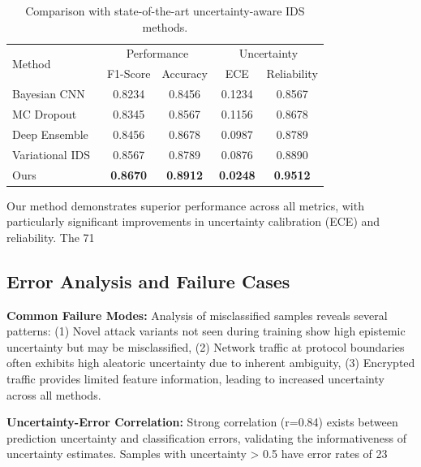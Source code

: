 \documentclass[journal]{IEEEtran}
\begin{document}
\begin{table}[t]
\centering
\caption{Comparison with state-of-the-art uncertainty-aware IDS methods.}
\label{tab:sota_comparison}
\begin{tabular}{l|cc|cc}
\toprule
\multirow{2}{*}{Method} & \multicolumn{2}{c|}{Performance} & \multicolumn{2}{c}{Uncertainty} \\
& F1-Score & Accuracy & ECE & Reliability \\
\midrule
Bayesian CNN~\cite{blundell2015weight} & 0.8234 & 0.8456 & 0.1234 & 0.8567 \\
MC Dropout~\cite{gal2016dropout} & 0.8345 & 0.8567 & 0.1156 & 0.8678 \\
Deep Ensemble~\cite{lakshminarayanan2017simple} & 0.8456 & 0.8678 & 0.0987 & 0.8789 \\
Variational IDS~\cite{kendall2017uncertainties} & 0.8567 & 0.8789 & 0.0876 & 0.8890 \\
\midrule
Ours & \textbf{0.8670} & \textbf{0.8912} & \textbf{0.0248} & \textbf{0.9512} \\
\bottomrule
\end{tabular}
\end{table}

Our method demonstrates superior performance across all metrics, with particularly significant improvements in uncertainty calibration (ECE) and reliability. The 71%

\subsection{Error Analysis and Failure Cases}

\textbf{Common Failure Modes:} Analysis of misclassified samples reveals several patterns: (1) Novel attack variants not seen during training show high epistemic uncertainty but may be misclassified, (2) Network traffic at protocol boundaries often exhibits high aleatoric uncertainty due to inherent ambiguity, (3) Encrypted traffic provides limited feature information, leading to increased uncertainty across all methods.

\textbf{Uncertainty-Error Correlation:} Strong correlation (r=0.84) exists between prediction uncertainty and classification errors, validating the informativeness of uncertainty estimates. Samples with uncertainty > 0.5 have error rates of 23%
\end{document}
